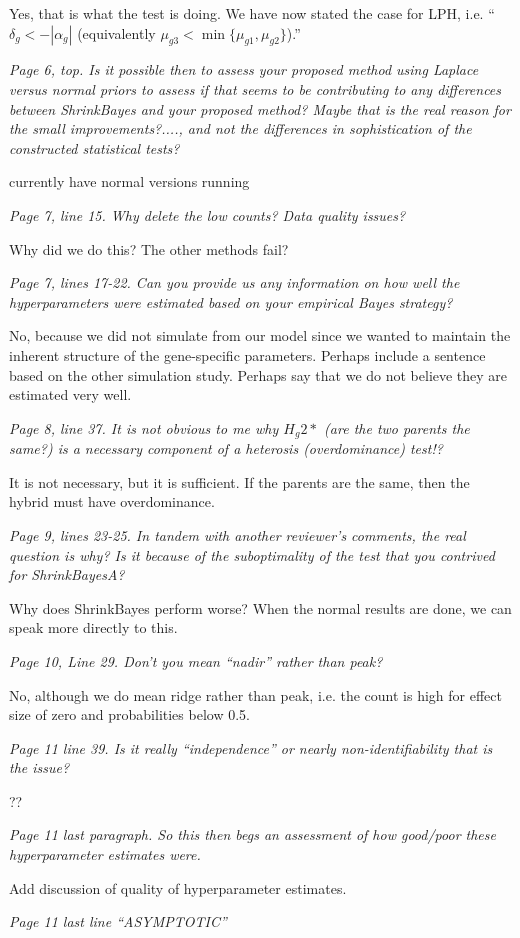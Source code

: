 \documentclass{article}
\newcommand{\comment}[1]{\textit{#1}}
\newcommand{\response}[1]{#1}
\newcommand{\todo}[1]{{\color{red} #1}}
\begin{document}
\response{Yes, that is what the test is doing. We have now stated the case for LPH, i.e. ``$\delta_g < -|\alpha_g|$ (equivalently $\mu_{g3} < \min\{\mu_{g1},\mu_{g2}\}$).''

\comment{Page 6, top.  Is it possible then to assess your proposed method using Laplace versus normal priors to assess if that seems to be contributing to any differences between ShrinkBayes and your proposed method?  Maybe that is the real reason for the small improvements?...., and not the differences in sophistication of the constructed statistical tests?}

\todo{currently have normal versions running}

\comment{Page 7, line 15.  Why delete the low counts?  Data quality issues?}

\todo{Why did we do this? The other methods fail?}

\comment{Page 7, lines 17-22.  Can you provide us any information on how well the hyperparameters were estimated based on your empirical Bayes strategy?}

\todo{No, because we did not simulate from our model since we wanted to maintain the inherent structure of the gene-specific parameters. Perhaps include a sentence based on the other simulation study. Perhaps say that we do not believe they are estimated very well.}

\comment{Page 8, line 37.  It is not obvious to me why $H_g2*$ (are the two parents the same?) is a necessary component of a heterosis (overdominance) test!?}

\response{It is not necessary, but it is sufficient. If the parents are the same, then the hybrid must have overdominance.}

\comment{Page 9, lines 23-25.  In tandem with another reviewer’s comments, the real question is why?  Is it because of the suboptimality of the test that you contrived for ShrinkBayesA?}

\todo{Why does ShrinkBayes perform worse? When the normal results are done, we can speak more directly to this.}

\comment{Page 10, Line 29.  Don’t you mean “nadir” rather than peak?}

\response{No, although we do mean ridge rather than peak, i.e. the count is high for effect size of zero and probabilities below 0.5.}

\comment{Page 11 line 39.  Is it really “independence” or nearly non-identifiability that is the issue?}

\todo{??}

\comment{Page 11 last paragraph.  So this then begs an assessment of how good/poor these hyperparameter estimates were.}

\todo{Add discussion of quality of hyperparameter estimates.}

\comment{Page 11 last line “ASYMPTOTIC”}}
\end{document}
